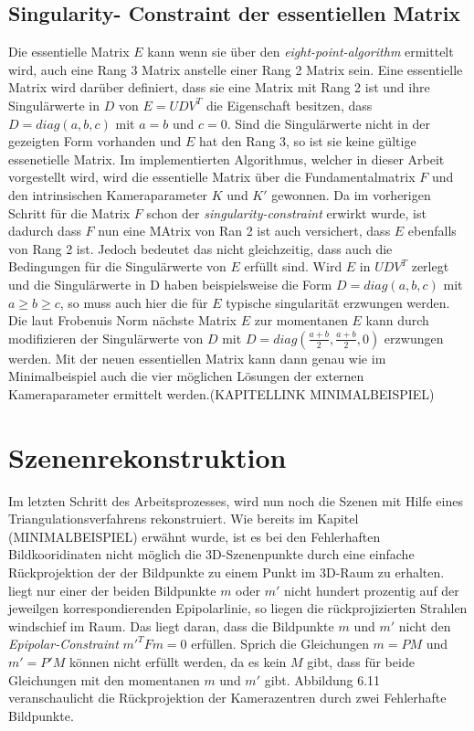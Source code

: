 \pagebreak

\subsection{Singularity- Constraint der essentiellen Matrix}

Die essentielle Matrix $E$ kann wenn sie über den \textit{eight-point-algorithm} ermittelt wird, auch eine Rang 3 Matrix anstelle einer Rang 2 Matrix sein. Eine essentielle Matrix wird darüber definiert, dass sie eine Matrix mit Rang 2 ist und ihre Singulärwerte in $D$ von $E = UDV^T$ die Eigenschaft besitzen, dass $ D = diag(a,b,c)$ mit $a=b$ und $c=0$. Sind die Singulärwerte nicht in der gezeigten Form vorhanden und $E$ hat den Rang 3, so ist sie keine gültige essenetielle Matrix\cite{HZ}. Im implementierten Algorithmus, welcher in dieser Arbeit vorgestellt wird, wird die essentielle Matrix über die Fundamentalmatrix $F$ und den intrinsischen Kameraparameter $K$ und $K'$ gewonnen. Da im vorherigen Schritt für die Matrix $F$ schon der \textit{singularity-constraint} erwirkt wurde, ist dadurch dass $F$ nun eine MAtrix von Ran 2 ist auch versichert, dass $E$ ebenfalls von Rang 2 ist. Jedoch bedeutet das nicht gleichzeitig, dass auch die Bedingungen für die Singulärwerte von $E$ erfüllt sind. Wird $E$ in $UDV^T$ zerlegt und die Singulärwerte in D haben beispielsweise die Form $D= diag(a,b,c)$ mit $a \geq b \geq c $, so muss auch hier die für $E$ typische singularität erzwungen werden. Die laut Frobenuis Norm nächste Matrix $E$ zur momentanen $E$ kann durch modifizieren der Singulärwerte von $D$ mit $D=diag(\frac{a+b}{2},\frac{a+b}{2},0)$ erzwungen werden\cite{HZ}. Mit der neuen essentiellen Matrix kann dann genau wie im Minimalbeispiel auch die vier möglichen Lösungen der externen Kameraparameter ermittelt werden.(KAPITELLINK MINIMALBEISPIEL) 

\section{Szenenrekonstruktion}

Im letzten Schritt des Arbeitsprozesses, wird nun noch die Szenen mit Hilfe eines Triangulationsverfahrens rekonstruiert. Wie bereits im Kapitel (MINIMALBEISPIEL) erwähnt wurde, ist es bei den Fehlerhaften Bildkooridinaten nicht möglich die 3D-Szenenpunkte durch eine einfache Rückprojektion der der Bildpunkte zu einem Punkt im 3D-Raum zu erhalten. liegt nur einer der beiden Bildpunkte $m$ oder $m'$ nicht hundert prozentig auf der jeweilgen korrespondierenden Epipolarlinie, so liegen die rückprojizierten Strahlen windschief im Raum. Das liegt daran, dass die Bildpunkte $m$ und $m'$ nicht den \textit{Epipolar-Constraint} $m'^T F m = 0$ erfüllen. Sprich die Gleichungen $m = PM$ und $m' = P'M$ können nicht erfüllt werden, da es kein $M$ gibt, dass für beide Gleichungen mit den momentanen $m$ und $m'$ gibt. Abbildung 6.11 veranschaulicht die Rückprojektion der Kamerazentren durch zwei Fehlerhafte Bildpunkte. 


